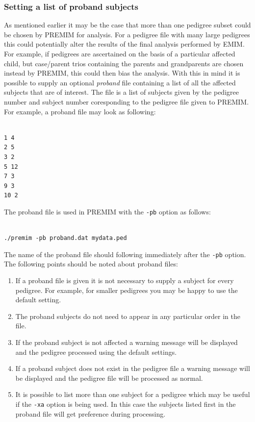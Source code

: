 \documentclass[a4paper,12pt]{article}
\newcommand{\code}[1]{{\footnotesize{{\tt #1}}}}
\begin{document}
\subsubsection{Setting a list of proband subjects}
\label{premim-proband}
As mentioned earlier it may be the case that more than one pedigree subset could be chosen by PREMIM for analysis. For a pedigree file with many large pedigrees this could potentially alter the results of the final analysis performed by EMIM. For example, if pedigrees are ascertained on the basis of a particular affected child, but case/parent trios containing the parents and grandparents are chosen instead by PREMIM, this could then bias the analysis. With this in mind it is possible to supply an optional {\it proband} file containing a list of all the affected subjects that are of interest. The file is a list of subjects given by the pedigree number and subject number coresponding to the pedigree file given to PREMIM. For example, a proband file may look as following: \vspace{0.35cm} \begin{lstlisting}

1 4
2 5
3 2
5 12
7 3
9 3
10 2

\end{lstlisting} \vspace{0.35cm}The proband file is used in PREMIM with the \code{-pb} option as follows: \vspace{0.35cm} \begin{lstlisting}

./premim -pb proband.dat mydata.ped

\end{lstlisting} \vspace{0.35cm}The name of the proband file should following immediately after the \code{-pb} option. The following points should be noted about proband files: \begin{enumerate}

\item If a proband file is given it is not necessary to supply a subject for every pedigree. For example, for smaller pedigrees you may be happy to use the default setting. 
\item The proband subjects do not need to appear in any particular order in the file. 
\item If the proband subject is not affected a warning message will be displayed and the pedigree processed using the default settings. 
\item If a proband subject does not exist in the pedigree file a warning message will be displayed and the pedigree file will be processed as normal. 
\item It is possible to list more than one subject for a pedigree which may be useful if the \code{-xa} option is being used. In this case the subjects listed first in the proband file will get preference during processing.\end{enumerate}
\end{document}
